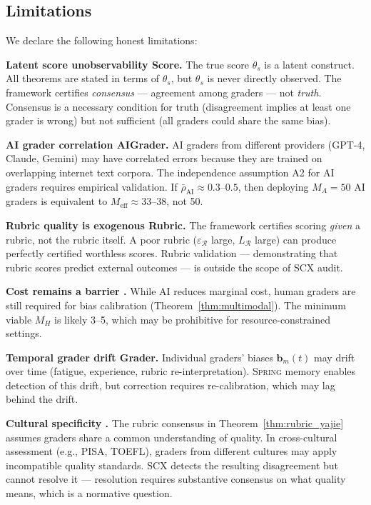 \documentclass[11pt,a4paper]{article}
\theoremstyle{definition}
\theoremstyle{remark}
\newcommand{\limitationTag}[1]{\textsf{\textbf{[L#1]}}}
\newcommand{\SCX}{\textsc{SCX}}
\newcommand{\Spring}{\textsc{Spring}}
\newcommand{\cR}{\mathcal{R}}
\newcommand{\rubric}{\cR}
\newcommand{\trueScore}{\theta}
\newcommand{\biasVec}{\mathbf{b}}
\begin{document}
\subsection{Limitations}
We declare the following honest limitations:
\begin{enumerate}[label=\limitationTag{\arabic*}, nosep]
    \item \textbf{Latent score unobservability Score.} The true score $\trueScore_s$ is a latent construct. All theorems are stated in terms of $\trueScore_s$, but $\trueScore_s$ is never directly observed. The framework certifies \textit{consensus} — agreement among graders — not \textit{truth}. Consensus is a necessary condition for truth (disagreement implies at least one grader is wrong) but not sufficient (all graders could share the same bias).
    \item \textbf{AI grader correlation AIGrader.} AI graders from different providers (GPT-4, Claude, Gemini) may have correlated errors because they are trained on overlapping internet text corpora. The independence assumption A2 for AI graders requires empirical validation. If $\bar{\rho}_{\text{AI}} \approx 0.3$--$0.5$, then deploying $M_A=50$ AI graders is equivalent to $M_{\text{eff}} \approx 33$--$38$, not 50.
    \item \textbf{Rubric quality is exogenous Rubric.} The framework certifies scoring \textit{given} a rubric, not the rubric itself. A poor rubric ($\varepsilon_\rubric$ large, $L_\rubric$ large) can produce perfectly certified worthless scores. Rubric validation — demonstrating that rubric scores predict external outcomes — is outside the scope of \SCX{} audit.
    \item \textbf{Cost remains a barrier .} While AI reduces marginal cost, human graders are still required for bias calibration (Theorem~\ref{thm:multimodal}). The minimum viable $M_H$ is likely 3--5, which may be prohibitive for resource-constrained settings.
    \item \textbf{Temporal grader drift Grader.} Individual graders' biases $\biasVec_m(t)$ may drift over time (fatigue, experience, rubric re-interpretation). \Spring{} memory enables detection of this drift, but correction requires re-calibration, which may lag behind the drift.
    \item \textbf{Cultural specificity .} The rubric consensus in Theorem~\ref{thm:rubric_yajie} assumes graders share a common understanding of quality. In cross-cultural assessment (e.g., PISA, TOEFL), graders from different cultures may apply incompatible quality standards. \SCX{} detects the resulting disagreement but cannot resolve it — resolution requires substantive consensus on what quality means, which is a normative question.
\end{enumerate}
\end{document}
